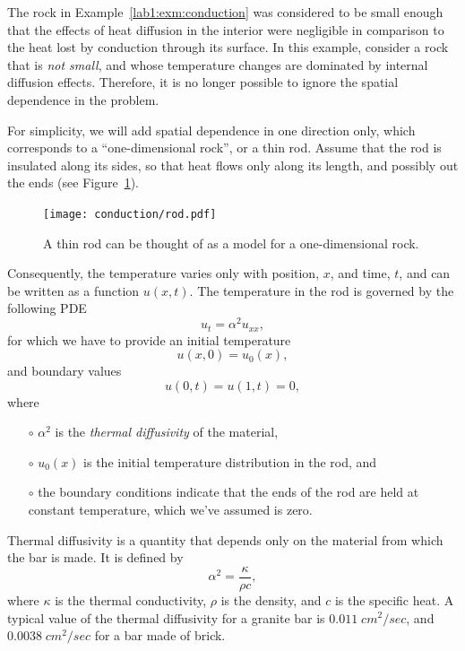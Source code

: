 \begin{example}
  \label{lab1:exm:diffusion1d}
  The rock in Example~\ref{lab1:exm:conduction} was considered to be small
  enough that the effects of heat diffusion in the interior
  were negligible in comparison to the heat lost by conduction
  through its surface.  
  In this example, consider a rock that is \emph{not small}, and whose
  temperature changes are dominated by internal diffusion effects.
  Therefore, it is no longer possible to ignore the spatial dependence
  in the problem.  

  For simplicity, we will add spatial dependence in one direction
  only, which corresponds to a ``one-dimensional rock'', or a thin
  rod.  Assume that the rod is insulated along its sides, so that heat
  flows only along its length, and possibly out the ends (see
  Figure~\ref{lab1:fig:rock-1d}).
  \begin{figure}[htbp]
    \begin{center}
      \leavevmode
      \texttt{[image: conduction/rod.pdf]}
      \caption{A thin rod can be thought of as a model for a
        one-dimensional rock.} 
      \label{lab1:fig:rock-1d}
    \end{center}
  \end{figure}
  Consequently, the temperature varies only with position, $x$, and
  time, $t$,
  and can be written as a function $u(x,t)$.   
  The temperature in the rod is governed by the following PDE
  \[
    u_t = \alpha^2 u_{xx},
  \]
  for which we have to provide an initial temperature 
  \[ 
    u(x,0) = u_0(x),
  \]
  and boundary values
  \[
    u(0,t)=u(1,t)=0,
  \]
  where 
  \begin{itemize}
  \item[$\circ$] $\alpha^2$ is the \emph{thermal diffusivity} of the
    material, 
  \item[$\circ$] $u_0(x)$ is the initial temperature distribution in the
    rod,  and
  \item[$\circ$] the boundary conditions indicate that the ends of the rod
    are held at constant temperature, which we've assumed is zero.
  \end{itemize}

  Thermal diffusivity is a quantity that depends only on the
  material from which the bar is made.  It is defined by 
  \[
  \alpha^2 = \frac{\kappa}{\rho c},
  \]
  where $\kappa$ is the thermal conductivity, $\rho$ is the density,
  and $c$ is the specific heat.  A typical value of the thermal
  diffusivity for a granite 
  bar is $0.011\;cm^2/sec$, and $0.0038\;cm^2/sec$ for a bar made of
  brick.  


\end{example}
